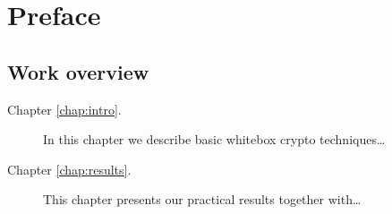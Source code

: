 \cleardoublepage{}   %
\chapter*{Preface}



\section*{Work overview}
	
	\begin{description}
		\item[Chapter \ref{chap:intro}.] In this chapter we describe basic whitebox crypto techniques\ldots
		\item[Chapter \ref{chap:results}.] This chapter presents our practical results together with\ldots
	\end{description}

